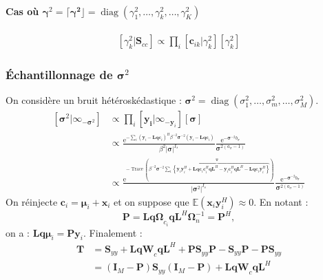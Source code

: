 \documentclass[ 12pt]{article}
\renewenvironment{equation}{\vspace{-0.2cm}\begin{oldequation}}{\vspace{-0.2cm}\end{oldequation}}
\newcommand{\diag}[1]{\lceil#1\rfloor}
\newcommand{\e}{\mathrm{e}}
\begin{document}
\begin{equation}
\end{equation}

\paragraph{Cas où $\bm{\gamma}^2 = \diag{\bm{\gamma^2 }} = \operatorname{diag}(\gamma^2_1, \dots, \gamma^2_k, \dots, \gamma_K^2)$}
\begin{align*}
	\left[ \gamma_k^2| \bm{S}_{cc} \right] \propto  \prod_i [\bm{c}_{ik} | \gamma_k^2] [\gamma^2_k]
\end{align*}
\begin{equation}
\end{equation}




\subsubsection[]{Échantillonnage de $\bm{\sigma}^2$}
On considère un bruit hétéroskédastique : $\bm{\sigma}^2 = \operatorname{diag}(\sigma^2_1,\dots,\sigma^2_m,\dots,\sigma^2_M)$.
\begin{align*}
	\left[  \bm{\sigma}^2|\infty_{-\bm{\sigma}^2}\right] &\propto \prod_i [\bm{y_i}| \infty_{-\bm{y}_i}][\bm{\sigma}]\\
	&\propto  \frac{\e^{-\sum_i (\bm{y}_{i}-\bm{L} \bm{qc}_i)^H \beta^{-2}\bm{\sigma}^{-2} (\bm{y}_{i} - \bm{L} \bm{qc}_i) }}{\beta^2| \bm{\sigma}|^{I_s}} \frac{\e^{-\bm{\sigma}^{-2} b_\sigma}}{\bm{\sigma}^{2(a_\sigma-1)}}\\
	& \propto \frac{ \e^{-\operatorname{Trace}\left( \beta^{-2} \bm{\sigma}^{-2} \overbrace{\sum_i \left\{   \bm{y}_i\bm{y}_i^H   
	+ \bm{Lqc}_i \bm{c}_i^H\bm{qL}^H
	-  \bm{y}_i\bm{c}_i^H \bm{qL}^H
	- \bm{Lqc}_i\bm{y}_i^H
	 \right\} }^{\bm{T}}\right) } }{|\bm{ \sigma}^2|^{I_s}}  \frac{\e^{-\bm{\sigma}^{-2} b_\sigma}}{\bm{\sigma}^{2(a_\sigma-1)}}
\end{align*}
On réinjecte $\bm{c}_i = \bm{\mu}_i + \bm{x}_i $ et on suppose que $\mathbb{E}(\bm{x}_i\bm{y}_i^H)\approx0$. En notant :
\begin{equation*}
        \bm{P}=\bm{Lq \Omega}_{c_i} \bm{qL}^H \bm{\Omega}_n^{-1} = \bm{P}^H,
\end{equation*}
on  a : $\displaystyle \bm{Lq\mu}_i = \bm{Py}_i$. Finalement : 
\begin{align*}
	\bm{T} &= \bm{S}_{yy} + \bm{LqW}_c \bm{qL}^H + \bm{PS}_{yy}\bm{P}
	- \bm{S}_{yy}\bm{P}
	- \bm{PS}_{yy}\\
	& = (\bm{I}_M -\bm{P}) \bm{S}_{yy} (\bm{I}_M -\bm{P}) + \bm{LqW}_c \bm{qL}^H
\end{align*}	
\end{document}

